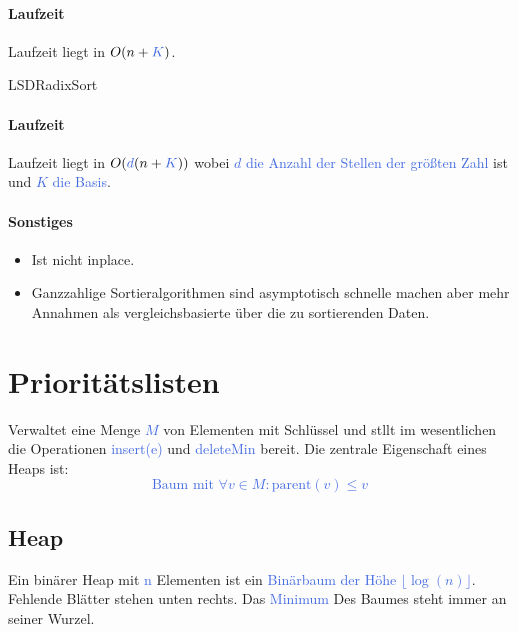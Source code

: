 \documentclass[11pt]{article}
\def \texcol{RoyalBlue}
\begin{document}
\paragraph{Laufzeit} Laufzeit liegt in $O(n+\textcolor{\texcol}{K})$.

\begin{algorithm}[H]
\caption{LSDRadixSort}
\DontPrintSemicolon
{}
\end{algorithm}

\paragraph{Laufzeit} Laufzeit liegt in $O(\textcolor{\texcol}{d}(n+\textcolor{\texcol}{K}))$ wobei \textcolor{\texcol}{$d$ die Anzahl der Stellen der größten Zahl} ist und \textcolor{\texcol}{$K$ die Basis}.

\paragraph{Sonstiges}
\begin{itemize}
\item Ist nicht inplace.
\item Ganzzahlige Sortieralgorithmen sind asymptotisch schnelle machen aber mehr Annahmen als vergleichsbasierte über die zu sortierenden Daten.
\end{itemize}

\section{Prioritätslisten}

Verwaltet eine Menge \textcolor{\texcol}{$M$} von Elementen mit Schlüssel und stllt im wesentlichen die Operationen \textcolor{\texcol}{insert(e)} und \textcolor{\texcol}{deleteMin} bereit. Die zentrale Eigenschaft eines Heaps ist:
\textcolor{\texcol}{\[ \text{Baum mit } \forall v \in M \colon \text{parent} (v) \leq v \]}

\subsection{Heap}

Ein binärer Heap mit \textcolor{\texcol}{n} Elementen ist ein \textcolor{\texcol}{Binärbaum der Höhe $\lfloor\log(n) \rfloor$}. Fehlende Blätter stehen unten rechts. Das \textcolor{\texcol}{Minimum} Des Baumes steht immer an seiner Wurzel.\\
\end{document}
